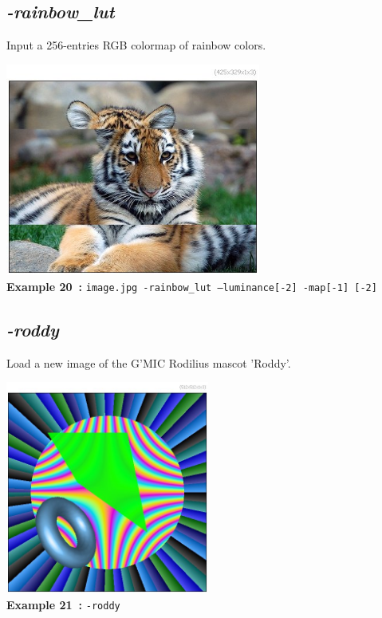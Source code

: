 \documentclass[a4paper,11pt,twoside]{book}
\begin{document}
\subsection{\emph{-rainbow\_lut} }\vspace*{-0.5em}
Input a 256-entries RGB colormap of rainbow colors.
\begin{center}\includegraphics[keepaspectratio=true,height=7cm,width=\textwidth]{img/gmic_def20.jpg}\\
{\footnotesize \textbf{Example 20~:} \texttt{image.jpg -rainbow\_lut --luminance[-2] -map[-1] [-2]}}
\end{center}

\subsection{\emph{-roddy} }\vspace*{-0.5em}
Load a new image of the G'MIC Rodilius mascot 'Roddy'.
\begin{center}\includegraphics[keepaspectratio=true,height=7cm,width=\textwidth]{img/gmic_def21.jpg}\\
{\footnotesize \textbf{Example 21~:} \texttt{-roddy}}
\end{center}
\end{document}
